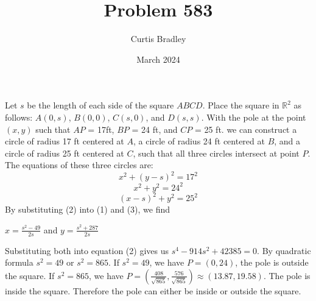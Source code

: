 \documentclass{article}
\title{Problem 583}
\author{Curtis Bradley}
\date{March 2024}
\begin{document}
Let $s$ be the length of each side of the square $ABCD$. Place the square in $\mathbb{R}^2$ as follows: $A(0,s)$, $B(0,0)$, $C(s,0)$, and $D(s,s)$. With the pole at the point $(x,y)$ such that $AP$ = 17ft, $BP$ = 24 ft, and $CP$ = 25 ft. we can construct a circle of radius 17 ft centered at $A$, a circle of radius 24 ft centered at $B$, and a circle of radius 25 ft centered at $C$, such that all three circles intersect at point $P$. The equations of these three circles are:
\begin{equation}
    x^2 + (y-s)^2 = 17^2
\end{equation}
\begin{equation}
    x^2+y^2=24^2
\end{equation}
\begin{equation}
    (x-s)^2 + y^2 = 25^2
\end{equation}
By substituting (2) into (1) and (3), we find 

\begin{center}
    $x = \frac{s^2-49}{2s}$ and $y=\frac{s^2 + 287}{2s}$
\end{center}
Substituting both into equation (2) gives us
$s^4 - 914s^2+ 42385 = 0$. By quadratic formula $s^2 = 49$ or $s^2 = 865$. If $s^2 = 49$, we have $P = (0,24)$, the pole is outside the square. If $s^2 = 865$, we have $P = (\frac{408}{\sqrt{865}},\frac{576}{\sqrt{865}})\approx (13.87,19.58)$. The pole is inside the square. Therefore the pole can either be inside or outside the square.
\end{document}
